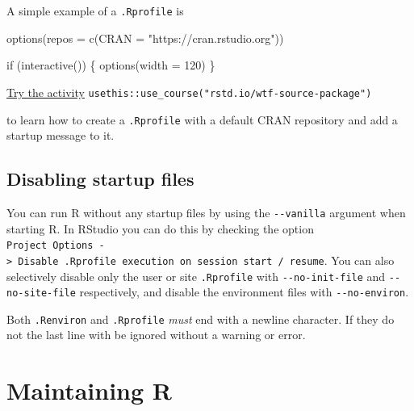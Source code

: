 \documentclass[
  letterpaper,
]{book}
\newenvironment{Shaded}{\begin{snugshade}}{\end{snugshade}}
\newcommand{\AttributeTok}[1]{\textcolor[rgb]{0.40,0.45,0.13}{#1}}
\newcommand{\ControlFlowTok}[1]{\textcolor[rgb]{0.00,0.23,0.31}{#1}}
\newcommand{\DecValTok}[1]{\textcolor[rgb]{0.68,0.00,0.00}{#1}}
\newcommand{\FunctionTok}[1]{\textcolor[rgb]{0.28,0.35,0.67}{#1}}
\newcommand{\NormalTok}[1]{\textcolor[rgb]{0.00,0.23,0.31}{#1}}
\newcommand{\StringTok}[1]{\textcolor[rgb]{0.13,0.47,0.30}{#1}}
\begin{document}
A simple example of a \texttt{.Rprofile} is

\begin{Shaded}
\begin{Highlighting}[]
\FunctionTok{options}\NormalTok{(}\AttributeTok{repos =} \FunctionTok{c}\NormalTok{(}\AttributeTok{CRAN =} \StringTok{"https://cran.rstudio.org"}\NormalTok{))}

\ControlFlowTok{if}\NormalTok{ (}\FunctionTok{interactive}\NormalTok{()) \{}
  \FunctionTok{options}\NormalTok{(}\AttributeTok{width =} \DecValTok{120}\NormalTok{)}
\NormalTok{\}}
\end{Highlighting}
\end{Shaded}

\begin{rmdinfo}
\href{https://raw.githubusercontent.com/rstats-wtf/wtf-startup/master/02_startup_spartan.R}{Try
the activity}
\texttt{usethis::use\_course("rstd.io/wtf-source-package")}

to learn how to create a \texttt{.Rprofile} with a default CRAN
repository and add a startup message to it.
\end{rmdinfo}

\hypertarget{disabling-startup-files}{%
\section{Disabling startup files}\label{disabling-startup-files}}

You can run R without any startup files by using the
\texttt{-\/-vanilla} argument when starting R. In RStudio you can do
this by checking the option
\texttt{Project\ Options\ -\textgreater{}\ Disable\ .Rprofile\ execution\ on\ session\ start\ /\ resume}.
You can also selectively disable only the user or site
\texttt{.Rprofile} with \texttt{-\/-no-init-file} and
\texttt{-\/-no-site-file} respectively, and disable the environment
files with \texttt{-\/-no-environ}.

\begin{rmdwarning}
Both \texttt{.Renviron} and \texttt{.Rprofile} \emph{must} end with a
newline character. If they do not the last line with be ignored without
a warning or error.
\end{rmdwarning}

\hypertarget{maintaining-r}{%
\chapter{Maintaining R}\label{maintaining-r}}
\end{document}
